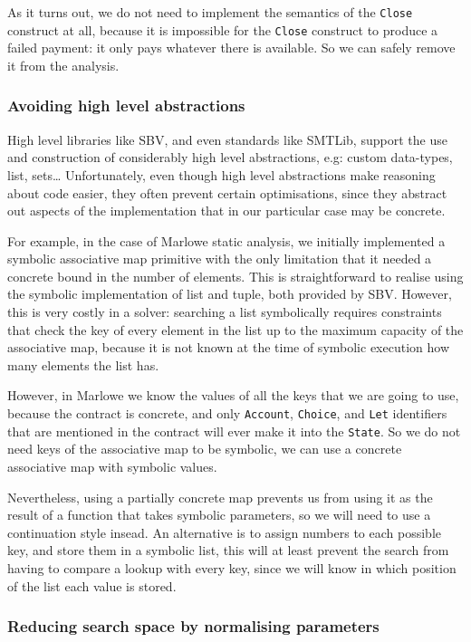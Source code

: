 \documentclass[english,runningheads]{llncs}
\begin{document}
As it turns out, we do not need to implement the semantics of the
\texttt{Close} construct at all, because it is impossible for the
\texttt{Close} construct to produce a failed payment: it only pays
whatever there is available. So we can safely remove it from the analysis.

\subsubsection{Avoiding high level abstractions }

High level libraries like SBV, and even standards like SMTLib, support
the use and construction of considerably high level abstractions,
e.g: custom data-types, list, sets\dots{} Unfortunately, even though
high level abstractions make reasoning about code easier, they often
prevent certain optimisations, since they abstract out aspects of
the implementation that in our particular case may be concrete.

For example, in the case of Marlowe static analysis, we initially
implemented a symbolic associative map primitive with the only limitation
that it needed a concrete bound in the number of elements. This is
straightforward to realise using the symbolic implementation of list
and tuple, both provided by SBV. However, this is very costly in a
solver: searching a list symbolically requires constraints that check
the key of every element in the list up to the maximum capacity of
the associative map, because it is not known at the time of symbolic
execution how many elements the list has.

However, in Marlowe we know the values of all the keys that we are
going to use, because the contract is concrete, and only \texttt{Account},
\texttt{Choice}, and \texttt{Let} identifiers that are mentioned in
the contract will ever make it into the \texttt{State}. So we do not
need keys of the associative map to be symbolic, we can use a concrete
associative map with symbolic values.

Nevertheless, using a partially concrete map prevents us from using
it as the result of a function that takes symbolic parameters, so
we will need to use a continuation style insead. An alternative is
to assign numbers to each possible key, and store them in a symbolic
list, this will at least prevent the search from having to compare
a lookup with every key, since we will know in which position of the
list each value is stored. 

\subsubsection{Reducing search space by normalising parameters\label{subsec:Reducing-search-space-by-normalising-parameters}}
\end{document}
